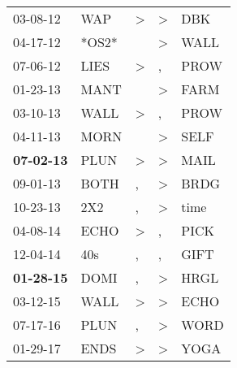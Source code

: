 \begin{supertabular}{p{0.07\textwidth}p{0.06\textwidth}p{0.02\textwidth}p{0.02\textwidth}p{0.06\textwidth}}
          03-08-12\textsuperscript{} &   WAP\textsuperscript{} &     \textgreater &     \textgreater &            DBK\textsuperscript{} \\
          04-17-12\textsuperscript{} &                   *OS2* &                  &     \textgreater &           WALL\textsuperscript{} \\
          07-06-12\textsuperscript{} &  LIES\textsuperscript{} &     \textgreater &                , &           PROW\textsuperscript{} \\
          01-23-13\textsuperscript{} &  MANT\textsuperscript{} &                  &     \textgreater &           FARM\textsuperscript{} \\
          03-10-13\textsuperscript{} &  WALL\textsuperscript{} &     \textgreater &                , &           PROW\textsuperscript{} \\
          04-11-13\textsuperscript{} &  MORN\textsuperscript{} &                  &     \textgreater &           SELF\textsuperscript{} \\
 \textbf{07-02-13\textsuperscript{}} &  PLUN\textsuperscript{} &     \textgreater &     \textgreater &           MAIL\textsuperscript{} \\
          09-01-13\textsuperscript{} &  BOTH\textsuperscript{} &                , &     \textgreater &           BRDG\textsuperscript{} \\
          10-23-13\textsuperscript{} &   2X2\textsuperscript{} &                , &     \textgreater &           time\textsuperscript{} \\
          04-08-14\textsuperscript{} &  ECHO\textsuperscript{} &     \textgreater &                , &           PICK\textsuperscript{} \\
          12-04-14\textsuperscript{} &   40s\textsuperscript{} &                , &                , &           GIFT\textsuperscript{} \\
 \textbf{01-28-15\textsuperscript{}} &  DOMI\textsuperscript{} &                , &     \textgreater &           HRGL\textsuperscript{} \\
          03-12-15\textsuperscript{} &  WALL\textsuperscript{} &     \textgreater &     \textgreater &           ECHO\textsuperscript{} \\
          07-17-16\textsuperscript{} &  PLUN\textsuperscript{} &                , &     \textgreater &           WORD\textsuperscript{} \\
          01-29-17\textsuperscript{} &  ENDS\textsuperscript{} &     \textgreater &     \textgreater &           YOGA\textsuperscript{} \\

\end{supertabular}
